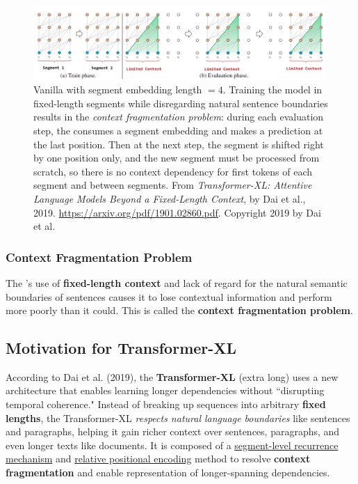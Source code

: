 \begin{figure}[h]
\vspace{-5pt}
\centering
\includegraphics[width=0.99\textwidth]{imgs/transXL_vanillaSegmentation.png}
\vspace{-5pt}
\caption{\footnotesize Vanilla  with segment embedding length $ = 4$. Training the model in fixed-length segments while disregarding natural sentence boundaries results in the \emph{context fragmentation problem}: during each evaluation step, the  consumes a segment embedding and makes a prediction at the last position. Then at the next step, the segment is shifted right by one position only, and the new segment must be processed from scratch, so there is no context dependency for first tokens of each segment and between segments. From \emph{Transformer-XL: Attentive Language Models Beyond a Fixed-Length Context}, by Dai et al., 2019. \url{https://arxiv.org/pdf/1901.02860.pdf}. Copyright 2019 by Dai et al.}
\vspace{-5pt}
\label{fig:transXL_VanillaSegment}
\end{figure}



\subsubsection{Context Fragmentation Problem} \label{sec:ContextFragmentationProblem}

The 's use of \textbf{fixed-length context} and lack of regard for the natural semantic boundaries of sentences causes it to lose contextual information and perform more poorly than it could. This is called the \textbf{context fragmentation problem}.


\subsection{Motivation for Transformer-XL} \label{sec:MotivationForTransformerXL}

According to Dai et al. (2019), the \textbf{Transformer-XL} (extra long) uses a new architecture that enables learning longer dependencies without ``disrupting temporal coherence." Instead of breaking up sequences into arbitrary \textbf{fixed lengths}, the Transformer-XL \emph{respects natural language boundaries} like sentences and paragraphs, helping it gain richer context over sentences, paragraphs, and even longer texts like documents. It is composed of a \hyperref[sec:SegmentLevelRec]{segment-level recurrence mechanism} and \hyperref[sec:RelativePosEnc]{relative positional encoding} method to resolve \textbf{context fragmentation} and enable representation of longer-spanning dependencies. 


